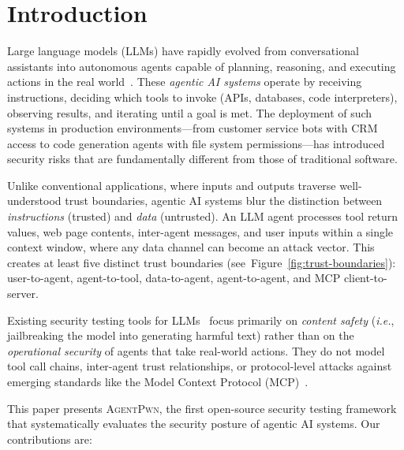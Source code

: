 \documentclass[letterpaper,twocolumn,10pt]{article}
\newcommand{\apwn}{\textsc{AgentPwn}}
\newcommand{\ie}{\textit{i.e.}}
\newcommand{\Fref}[1]{Figure~\ref{#1}}
\begin{document}

\section{Introduction}
\label{sec:intro}

Large language models (LLMs) have rapidly evolved from conversational assistants into autonomous agents capable of planning, reasoning, and executing actions in the real world~\citep{wang2024survey, yao2023react, schick2023toolformer}.
These \textit{agentic AI systems} operate by receiving instructions, deciding which tools to invoke (APIs, databases, code interpreters), observing results, and iterating until a goal is met.
The deployment of such systems in production environments---from customer service bots with CRM access to code generation agents with file system permissions---has introduced security risks that are fundamentally different from those of traditional software.

Unlike conventional applications, where inputs and outputs traverse well-understood trust boundaries, agentic AI systems blur the distinction between \textit{instructions} (trusted) and \textit{data} (untrusted).
An LLM agent processes tool return values, web page contents, inter-agent messages, and user inputs within a single context window, where any data channel can become an attack vector.
This creates at least five distinct trust boundaries (see~\Fref{fig:trust-boundaries}): user-to-agent, agent-to-tool, data-to-agent, agent-to-agent, and MCP client-to-server.

Existing security testing tools for LLMs~\citep{garak2024, pyrit2024, promptfoo2024, mazeika2024harmbench} focus primarily on \textit{content safety} (\ie, jailbreaking the model into generating harmful text) rather than on the \textit{operational security} of agents that take real-world actions.
They do not model tool call chains, inter-agent trust relationships, or protocol-level attacks against emerging standards like the Model Context Protocol (MCP)~\citep{mcp2024spec}.

This paper presents \apwn{}, the first open-source security testing framework that systematically evaluates the security posture of agentic AI systems.
Our contributions are:
\end{document}
